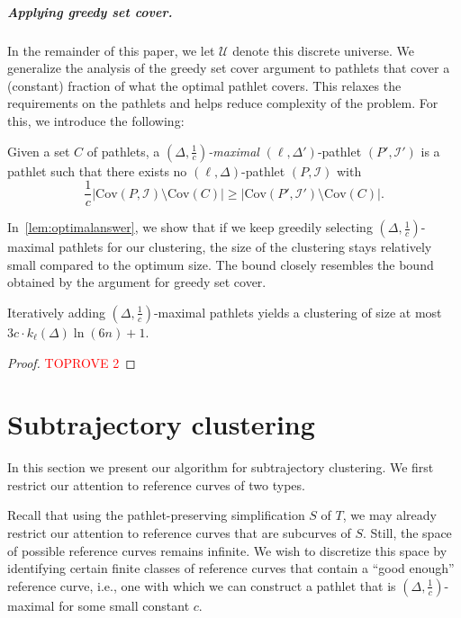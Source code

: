 \documentclass[a4paper,UKenglish,cleveref,thm-restate,notab]{lipics-v2021}
\newcommand{\I}{\mathcal{I}}
\newcommand{\U}{\mathcal{U}}
\newcommand{\Cov}{\ensuremath{\mathrm{Cov}}}
\begin{document}
    \subparagraph{Applying greedy set cover.}
    In the remainder of this paper, we let $\U$ denote this discrete universe.
    We generalize the analysis of the greedy set cover argument to pathlets that cover a (constant) fraction of what the optimal pathlet covers.
    This relaxes the requirements on the pathlets and helps reduce complexity of the problem.
    For this, we introduce the following:

    \begin{definition}
        Given a set $C$ of pathlets, a \emph{$(\Delta, \frac{1}{c})$-maximal} $(\ell, \Delta')$-pathlet $(P', \I')$ is a pathlet such that there exists no $(\ell, \Delta)$-pathlet $(P, \I)$ with 
        \[
            \frac{1}{c} | \Cov(P, \I) \setminus \Cov(C) |  \geq | \Cov(P', \I') \setminus \Cov(C) |.
        \]
    \end{definition}

    \noindent
    In~\cref{lem:optimalanswer}, we show that if we keep greedily selecting $(\Delta, \frac{1}{c})$-maximal pathlets for our clustering, the size of the clustering stays relatively small compared to the optimum size.
    The bound closely resembles the bound obtained by the argument for greedy set cover.

    \begin{lemma}
    \label{lem:optimalanswer}
        Iteratively adding $(\Delta, \frac{1}{c})$-maximal pathlets yields a clustering of size at most $3c \cdot k_\ell(\Delta) \ln (6n) + 1$.
    \end{lemma}
    \begin{proof}\textcolor{red}{TOPROVE 2}\end{proof}


\section{Subtrajectory clustering}
\label{sec:the_algorithm}

    In this section we present our algorithm for subtrajectory clustering.
    We first restrict our attention to reference curves of two types.
    
    Recall that using the pathlet-preserving simplification $S$ of $T$, we may already restrict our attention to reference curves that are subcurves of $S$.
    Still, the space of possible reference curves remains infinite.
    We wish to discretize this space by identifying certain finite classes of reference curves that contain a ``good enough'' reference curve, i.e., one with which we can construct a pathlet that is $(\Delta, \frac{1}{c})$-maximal for some small constant $c$.
\end{document}
